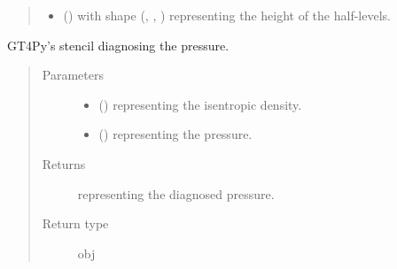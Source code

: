 \documentclass[letterpaper,10pt,english]{sphinxmanual}
\begin{document}
\begin{fulllineitems}
\begin{fulllineitems}
\begin{quote}
\begin{description}
\begin{itemize}
\item {} 
 () \textendash{}  with shape (, , ) representing the height of the half-levels.

\end{itemize}

\end{description}\end{quote}

\end{fulllineitems}


\begin{fulllineitems}
\label{\detokenize{api:dycore.diagnostic_isentropic.DiagnosticIsentropic._stencil_diagnosing_air_pressure_defs}}
GT4Py’s stencil diagnosing the pressure.
\begin{quote}\begin{description}
\item[{Parameters}] \leavevmode\begin{itemize}
\item {} 
 () \textendash{}  representing the isentropic density.

\item {} 
 () \textendash{}  representing the pressure.

\end{itemize}

\item[{Returns}] \leavevmode
{} representing the diagnosed pressure.

\item[{Return type}] \leavevmode
obj

\end{description}\end{quote}

\end{fulllineitems}


\end{fulllineitems}
\end{document}
